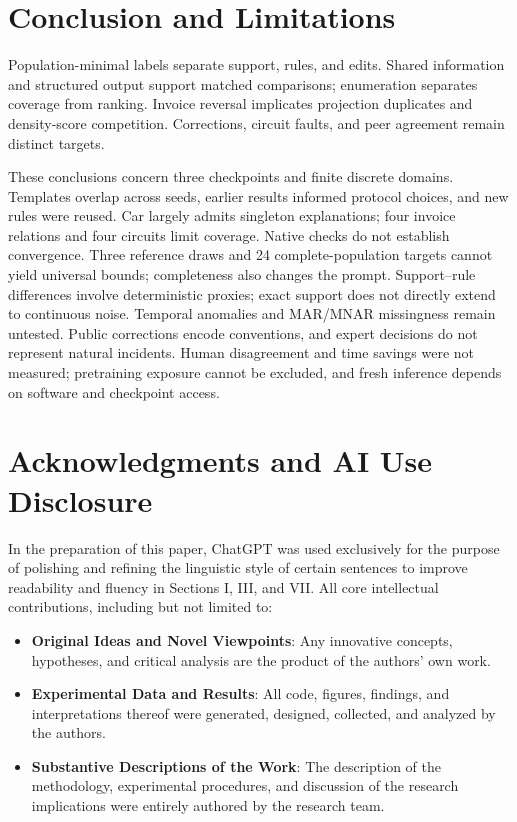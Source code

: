 \documentclass[conference]{IEEEtran}
\begin{document}
\section{Conclusion and Limitations}
Population-minimal labels separate support, rules, and edits. Shared information and structured output support matched comparisons; enumeration separates coverage from ranking. Invoice reversal implicates projection duplicates and density-score competition. Corrections, circuit faults, and peer agreement remain distinct targets.

These conclusions concern three checkpoints and finite discrete domains. Templates overlap across seeds, earlier results informed protocol choices, and new rules were reused. Car largely admits singleton explanations; four invoice relations and four circuits limit coverage. Native checks do not establish convergence. Three reference draws and 24 complete-population targets cannot yield universal bounds; completeness also changes the prompt. Support--rule differences involve deterministic proxies; exact support does not directly extend to continuous noise. Temporal anomalies and MAR/MNAR missingness remain untested. Public corrections encode conventions, and expert decisions do not represent natural incidents. Human disagreement and time savings were not measured; pretraining exposure cannot be excluded, and fresh inference depends on software and checkpoint access.

\label{page:main-end}
\section*{Acknowledgments and AI Use Disclosure}
In the preparation of this paper, ChatGPT was used exclusively for the purpose of polishing and refining the linguistic style of certain sentences to improve readability and fluency in Sections I, III, and VII. All core intellectual contributions, including but not limited to:
\begin{itemize}
    \item \textbf{Original Ideas and Novel Viewpoints}: Any innovative concepts, hypotheses, and critical analysis are the product of the authors' own work.
\item \textbf{Experimental Data and Results}: All code, figures, findings, and interpretations thereof were generated, designed, collected, and analyzed by the authors.
\item \textbf{Substantive Descriptions of the Work}: The description of the methodology, experimental procedures, and discussion of the research implications were entirely authored by the research team.
\end{itemize}


\end{document}
